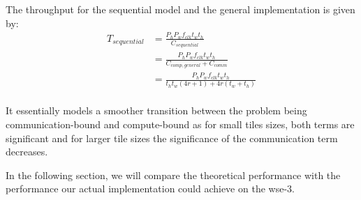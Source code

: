 The throughput for the sequential model and the general implementation is given by:
\begin{equation}
    \label{eq:throughput_sequential}
    \begin{aligned}
        T_{sequential} &= \frac{P_h P_w f_{clk} t_w t_h}{C_{sequential}} \\
        &= \frac{P_h P_w f_{clk} t_w t_h}{C_{comp,general} + C_{comm}} \\
        &= \frac{P_h P_w f_{clk} t_w t_h}{t_h t_w \left(4r + 1\right) + 4r\left(t_w+t_h\right)} \\
    \end{aligned}
\end{equation}

It essentially models a smoother transition between the problem being communication-bound and compute-bound as for small tiles sizes, both terms are significant and for larger tile sizes the significance of the communication term decreases.

In the following section, we will compare the theoretical performance with the performance our actual implementation could achieve on the \ac{wse}-3.